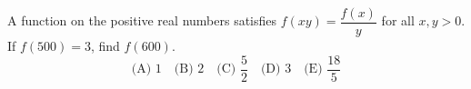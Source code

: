 A function on the positive real numbers satisfies $f(xy)=\dfrac{f(x)}{y}$ for all $x,y>0$. If $f(500)=3$, find $f(600)$.
\[
\text{(A) }1\quad\text{(B) }2\quad\text{(C) }\dfrac{5}{2}
\quad\text{(D) }3\quad\text{(E) }\dfrac{18}{5}
\]
